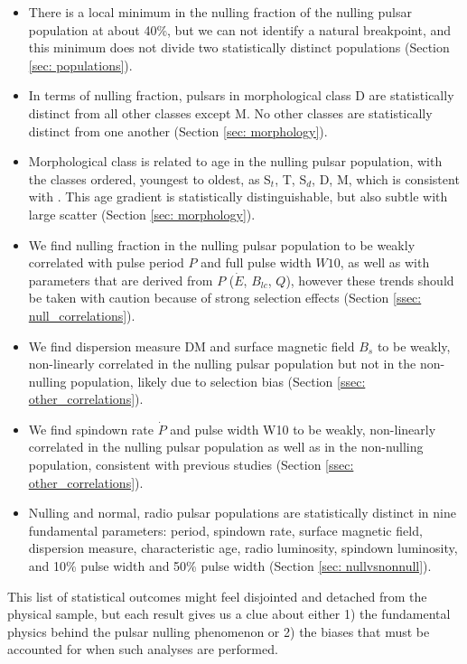 \documentclass[fleqn,usenatbib]{mnras}
\begin{document}
\begin{itemize}
    \item There is a local minimum in the nulling fraction of the nulling pulsar population at about 40\%, but we can not identify a natural breakpoint, and this minimum does not divide two statistically distinct populations (Section \ref{sec: populations}).
    \item In terms of nulling fraction, pulsars in morphological class D are statistically distinct from all other classes except M. No other classes are statistically distinct from one another (Section \ref{sec: morphology}).
    \item Morphological class is related to age in the nulling pulsar population, with the classes ordered, youngest to oldest, as S$_t$, T, S$_d$, D, M, which is consistent with \citet{Rankin1986}. This age gradient is statistically distinguishable, but also subtle with large scatter (Section \ref{sec: morphology}).
    \item We find nulling fraction in the nulling pulsar population to be weakly correlated with pulse period $P$ and full pulse width $W10$, as well as with parameters that are derived from $P$ ($\dot{E}$, $B_{lc}$, $Q$), however these trends should be taken with caution because of strong selection effects (Section \ref{ssec: null_correlations}).
    \item We find dispersion measure DM and surface magnetic field $B_s$ to be weakly, non-linearly correlated in the nulling pulsar population but not in the non-nulling population, likely due to selection bias (Section \ref{ssec: other_correlations}).
    \item We find spindown rate $\dot{P}$ and pulse width W10 to be weakly, non-linearly correlated in the nulling pulsar population as well as in the non-nulling population, consistent with previous studies (Section \ref{ssec: other_correlations}).
    \item Nulling and normal, radio pulsar populations are statistically distinct in nine fundamental parameters: period, spindown rate, surface magnetic field, dispersion measure, characteristic age, radio luminosity, spindown luminosity, and 10\% pulse width and 50\% pulse width (Section \ref{sec: nullvsnonnull}). 
\end{itemize}

This list of statistical outcomes might feel disjointed and detached from the physical sample, but each result gives us a clue about either 1) the fundamental physics behind the pulsar nulling phenomenon or 2) the biases that must be accounted for when such analyses are performed. 
\end{document}
